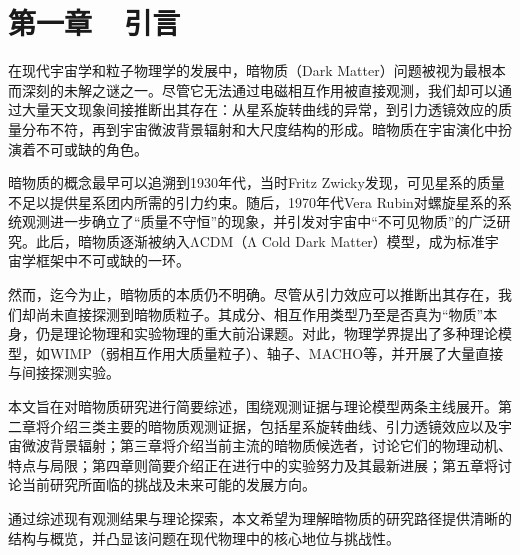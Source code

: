 \pagestyle{fancy} %
\setcounter{page}{1} %
\chead{} %
\lfoot{} %
\cfoot{\thepage} %
\rfoot{} %


\section*{第一章~~引言}
\setcounter{section}{1} \setcounter{subsection}{0}

在现代宇宙学和粒子物理学的发展中，暗物质（Dark Matter）问题被视为最根本而深刻的未解之谜之一。尽管它无法通过电磁相互作用被直接观测，我们却可以通过大量天文现象间接推断出其存在：从星系旋转曲线的异常，到引力透镜效应的质量分布不符，再到宇宙微波背景辐射和大尺度结构的形成。暗物质在宇宙演化中扮演着不可或缺的角色。

暗物质的概念最早可以追溯到1930年代，当时Fritz Zwicky发现，可见星系的质量不足以提供星系团内所需的引力约束。随后，1970年代Vera Rubin对螺旋星系的系统观测进一步确立了“质量不守恒”的现象，并引发对宇宙中“不可见物质”的广泛研究\cite{bertone2018history}。此后，暗物质逐渐被纳入ΛCDM（Λ Cold Dark Matter）模型，成为标准宇宙学框架中不可或缺的一环。

然而，迄今为止，暗物质的本质仍不明确。尽管从引力效应可以推断出其存在，我们却尚未直接探测到暗物质粒子。其成分、相互作用类型乃至是否真为“物质”本身，仍是理论物理和实验物理的重大前沿课题。对此，物理学界提出了多种理论模型，如WIMP（弱相互作用大质量粒子）、轴子、MACHO等，并开展了大量直接与间接探测实验。

本文旨在对暗物质研究进行简要综述，围绕观测证据与理论模型两条主线展开。第二章将介绍三类主要的暗物质观测证据，包括星系旋转曲线、引力透镜效应以及宇宙微波背景辐射；第三章将介绍当前主流的暗物质候选者，讨论它们的物理动机、特点与局限；第四章则简要介绍正在进行中的实验努力及其最新进展；第五章将讨论当前研究所面临的挑战及未来可能的发展方向。

通过综述现有观测结果与理论探索，本文希望为理解暗物质的研究路径提供清晰的结构与概览，并凸显该问题在现代物理中的核心地位与挑战性。

\newpage


